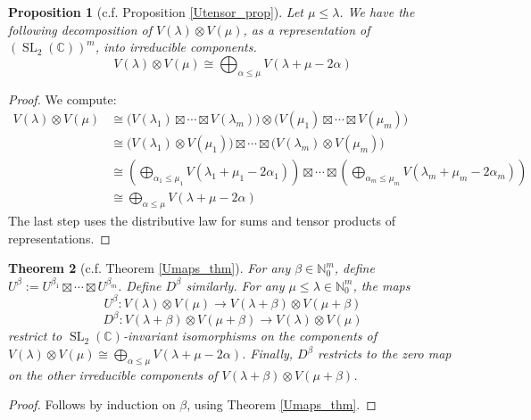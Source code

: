 \documentclass{article}
\newtheorem{theorem}{Theorem}[section]
\newtheorem{proposition}[theorem]{Proposition}
\theoremstyle{definition}
\theoremstyle{plain}
\newcommand{\C}{\mathbb{C}}
\newcommand{\N}{\mathbb{N}}
\DeclareMathOperator{\SL}{SL}
\begin{document}
\begin{proposition}[c.f. Proposition \ref{Utensor_prop}]\label{Mtensor_prop}
    Let $\mu \leq \lambda$. We have the following decomposition of $V(\lambda) \otimes V(\mu)$, as a representation of $(\SL_2(\C))^m$, into irreducible components.
    \[
        V(\lambda) \otimes V(\mu) \cong \bigoplus_{\alpha \leq \mu} V(\lambda + \mu - 2\alpha)
    \]
\end{proposition}
\begin{proof}
    We compute:
    \[
        \begin{split}
            V(\lambda) \otimes V(\mu) &\cong \big(V(\lambda_1) \boxtimes \cdots \boxtimes V(\lambda_m)\big) \otimes \big(V(\mu_1) \boxtimes \cdots \boxtimes V(\mu_m)\big) \\
                &\cong \big(V(\lambda_1) \otimes V(\mu_1)\big) \boxtimes \cdots \boxtimes \big(V(\lambda_m) \otimes V(\mu_m)\big) \\
                &\cong \left(\bigoplus_{\alpha_1 \leq \mu_1} V(\lambda_1 + \mu_1 - 2\alpha_1)\right) \boxtimes \cdots \boxtimes \left(\bigoplus_{\alpha_m \leq \mu_m} V(\lambda_m + \mu_m - 2\alpha_m)\right) \\
                &\cong \bigoplus_{\alpha \leq \mu} V(\lambda + \mu - 2\alpha)
        \end{split}
    \]
    The last step uses the distributive law for sums and tensor products of representations.
\end{proof}

\begin{theorem}[c.f. Theorem \ref{Umaps_thm}]
    For any $\beta \in \N_0^m$, define $U^\beta := U^{\beta_1} \boxtimes \cdots \boxtimes U^{\beta_m}$. Define $D^\beta$ similarly. For any $\mu \leq \lambda \in \N_0^m$, the maps
    \[
        U^\beta: V(\lambda) \otimes V(\mu) \rightarrow V(\lambda + \beta) \otimes V(\mu + \beta)
    \]
    \[
        D^\beta: V(\lambda + \beta) \otimes V(\mu + \beta) \rightarrow V(\lambda) \otimes V(\mu)
    \]
    restrict to $\SL_2(\C)$-invariant isomorphisms on the components of $V(\lambda) \otimes V(\mu) \cong \bigoplus_{\alpha \leq \mu} V(\lambda + \mu - 2\alpha)$. Finally, $D^\beta$ restricts to the zero map on the other irreducible components of $V(\lambda + \beta) \otimes V(\mu + \beta)$.
\end{theorem}
\begin{proof}
    Follows by induction on $\beta$, using Theorem \ref{Umaps_thm}.
\end{proof}
\end{document}
